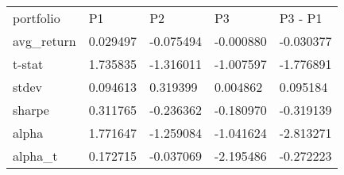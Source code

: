 \begin{tabular}{lllll}
\toprule
\midrule
portfolio & P1 & P2 & P3 & P3 - P1 \\
avg_return & 0.029497 & -0.075494 & -0.000880 & -0.030377 \\
t-stat & 1.735835 & -1.316011 & -1.007597 & -1.776891 \\
stdev & 0.094613 & 0.319399 & 0.004862 & 0.095184 \\
sharpe & 0.311765 & -0.236362 & -0.180970 & -0.319139 \\
alpha & 1.771647 & -1.259084 & -1.041624 & -2.813271 \\
alpha_t & 0.172715 & -0.037069 & -2.195486 & -0.272223 \\
\bottomrule
\end{tabular}
